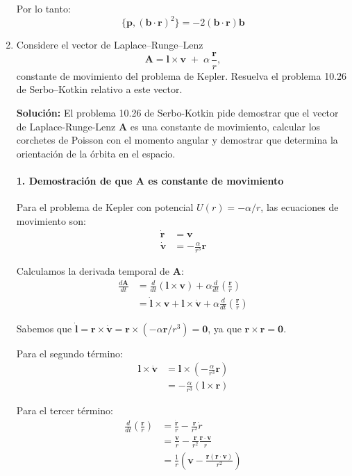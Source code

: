 \documentclass[12pt]{article}
\begin{document}
\begin{enumerate}
  Por lo tanto:
  \[
  \{\mathbf{p}, (\mathbf{b}\cdot\mathbf{r})^2\} = -2(\mathbf{b}\cdot\mathbf{r})\mathbf{b}
  \]

  \item Considere el vector de Laplace–Runge–Lenz
    \[
      \mathbf A = \mathbf l\times\mathbf v \;+\;\alpha\,\frac{\mathbf r}{r},
    \]
    constante de movimiento del problema de Kepler. Resuelva el problema 10.26 de Serbo–Kotkin relativo a este vector.

  \textbf{Solución:}
  El problema 10.26 de Serbo-Kotkin pide demostrar que el vector de Laplace-Runge-Lenz $\mathbf{A}$ es una constante de movimiento, calcular los corchetes de Poisson con el momento angular y demostrar que determina la orientación de la órbita en el espacio.

  \paragraph{1. Demostración de que $\mathbf{A}$ es constante de movimiento}

  Para el problema de Kepler con potencial $U(r) = -\alpha/r$, las ecuaciones de movimiento son:
  \begin{align}
  \dot{\mathbf{r}} &= \mathbf{v} \\
  \dot{\mathbf{v}} &= -\frac{\alpha}{r^3}\mathbf{r}
  \end{align}

  Calculamos la derivada temporal de $\mathbf{A}$:
  \begin{align}
  \frac{d\mathbf{A}}{dt} &= \frac{d}{dt}(\mathbf{l} \times \mathbf{v}) + \alpha\frac{d}{dt}\left(\frac{\mathbf{r}}{r}\right) \\
  &= \dot{\mathbf{l}} \times \mathbf{v} + \mathbf{l} \times \dot{\mathbf{v}} + \alpha\frac{d}{dt}\left(\frac{\mathbf{r}}{r}\right)
  \end{align}

  Sabemos que $\dot{\mathbf{l}} = \mathbf{r} \times \dot{\mathbf{v}} = \mathbf{r} \times (-\alpha\mathbf{r}/r^3) = \mathbf{0}$, ya que $\mathbf{r} \times \mathbf{r} = \mathbf{0}$.

  Para el segundo término:
  \begin{align}
  \mathbf{l} \times \dot{\mathbf{v}} &= \mathbf{l} \times \left(-\frac{\alpha}{r^3}\mathbf{r}\right) \\
  &= -\frac{\alpha}{r^3}(\mathbf{l} \times \mathbf{r})
  \end{align}

  Para el tercer término:
  \begin{align}
  \frac{d}{dt}\left(\frac{\mathbf{r}}{r}\right) &= \frac{\dot{\mathbf{r}}}{r} - \frac{\mathbf{r}}{r^2}\dot{r} \\
  &= \frac{\mathbf{v}}{r} - \frac{\mathbf{r}}{r^2}\frac{\mathbf{r}\cdot\mathbf{v}}{r} \\
  &= \frac{1}{r}\left(\mathbf{v} - \frac{\mathbf{r}(\mathbf{r}\cdot\mathbf{v})}{r^2}\right)
  \end{align}


\end{enumerate}
\end{document}
